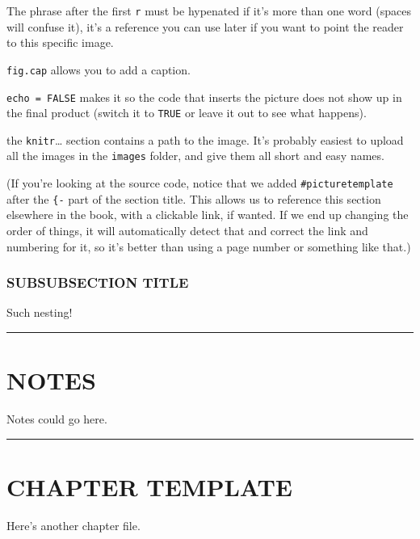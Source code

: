 \documentclass[
]{book}
\begin{document}
The phrase after the first \texttt{r} must be hypenated if it's more than one word (spaces will confuse it),
it's a reference you can use later if you want to point the reader to this specific image.

\texttt{fig.cap} allows you to add a caption.

\texttt{echo\ =\ FALSE} makes it so the code that inserts the picture does not show up in the final product (switch it to \texttt{TRUE} or leave it out to see what happens).

the \texttt{knitr}\ldots{} section contains a path to the image.
It's probably easiest to upload all the images in the \texttt{images} folder,
and give them all short and easy names.

(If you're looking at the source code, notice that we added \texttt{\#picturetemplate} after the \texttt{\{-} part of the section title.
This allows us to reference this section elsewhere in the book, with a clickable link, if wanted.
If we end up changing the order of things, it will automatically detect that and correct the link and numbering for it,
so it's better than using a page number or something like that.)

\hypertarget{subsubsection-title}{%
\subsection*{SUBSUBSECTION TITLE}\label{subsubsection-title}}


Such nesting!

\begin{center}\rule{0.5\linewidth}{0.5pt}\end{center}

\hypertarget{notes}{%
\chapter*{NOTES}\label{notes}}


Notes could go here.

\begin{center}\rule{0.5\linewidth}{0.5pt}\end{center}

\hypertarget{chapter-template-1}{%
\chapter*{CHAPTER TEMPLATE}\label{chapter-template-1}}


Here's another chapter file.
\end{document}
